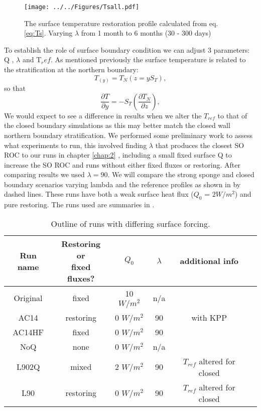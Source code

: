\begin{figure}[H]
		\center
        \texttt{[image: ../../Figures/Tsall.pdf]}
    \caption{The surface temperature restoration profile calculated from eq. \ref{eq:Ts}. Varying $\lambda $ from 1 month to 6 months (30 - 300 days)}
    \label{fig:Tsall}
\end{figure}


To establish the role of surface boundary condition we can adjust 3 parameters: Q , $\lambda $ and T$_ref$. As mentioned previously the surface temperature is related to the stratification at the northern boundary:
\begin{equation*}
T_(y) = T_N(z=yS_T),
\end{equation*}
so that
\begin{equation*}
\frac{\partial T}{\partial y} =  -S_T \left(\frac{\partial T_N}{\partial z}\right),
\end{equation*}
We would expect to see a difference in results when we alter the $T_{ref}$ to that of the closed boundary simulations as this may better match the closed wall northern boundary stratification. We performed some preliminary work to assess what experiments to run, this involved finding $ \lambda $ that produces the closest SO ROC to our runs in chapter \ref{chap:2} , including a small fixed surface Q to increase the SO ROC and runs without
either fixed fluxes or restoring. After comparing results we used $\lambda = 90 $. We will compare the strong sponge and closed boundary scenarios varying lambda and the reference profiles as shown in  by dashed lines. These runs have both a weak surface heat flux ($Q_0$ = $2 W/m^2$) and pure restoring. The runs used are summaries in . 
\begin{table}[h]
\caption{Outline of runs with differing surface forcing.}
\label{tab:run}
\begin{center}
\begin{tabular}{|c|c|c|c|c|c|}
\hline \hline
\textbf{Run name} & \pbox{20cm}{\textbf{Restoring or}\\ \textbf{ fixed fluxes?} } & \textbf{$Q_0$} & \textbf{$\lambda $} & \textbf{additional info} \\ 
\hline 
Original & fixed & 10 $W/m^2$    & n/a &  \\ 
\hline 
AC14  & restoring & 0 $W/m^2$    &  90 & with KPP \\ 
\hline 
AC14HF & fixed & 0 $W/m^2$    &  90    & \\ 
\hline 
NoQ   & none  & 0 $W/m^2$    & n/a   & \\ 
\hline 
L902Q  & mixed & 2 $W/m^2$    &  90   & $T_{ref}$ altered for closed\\ 
\hline 
L90  & restoring & 0 $W/m^2$    &  90  & $T_{ref}$ altered for closed  \\ 
\hline 
\end{tabular}
\end{center}
\end{table}

